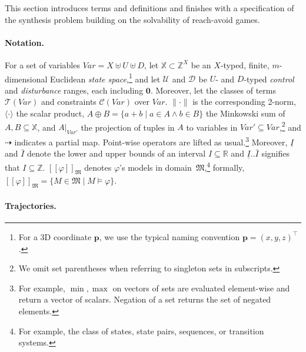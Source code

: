 \documentclass{article}
\newcommand\mkYcAoM[1][]{\mathcal{D}_{#1}}
\newcommand\mpBykPY[1][]{\mathcal{U}_{#1}}
\newcommand\mfBPXHb[1]{#1^\intercal}
\def\norm#1{\lVert#1\rVert}
\newcommand\mGctqYz[1][X]{\mathcal{C}(#1)}
\newcommand\mRxFzBg[1][X]{\mathcal{T}(#1)}
\newcommand\mcrHMQW[1]{[\![#1]\!]}
\renewcommand\vec[1]{\mathbf{#1}}
\begin{document}
{This section introduces terms and definitions and finishes with a
specification of the synthesis problem building on the solvability of
reach-avoid games.

\paragraph{Notation.} 

For a set of variables
$\mathit{Var}=X\uplus U\uplus D$,
let ${\mathbb{X}}\subset\ensuremath{\mathbb{Z}}^{X}$ be an $X$-typed,
finite,
$m$-dimensional Euclidean \emph{state space},\footnote{For a 3D
  coordinate $\vec p$, we use the typical naming convention
  $\vec p=\mfBPXHb{(x,y,z)}$.}  and let $\mpBykPY$ and $\mkYcAoM$
be $U$- and $D$-typed \emph{control} and
\emph{disturbance} ranges, each including $\vec 0$.
Moreover, let 
the classes of terms $\mRxFzBg[\mathit{Var}]$ 
and constraints
$\mGctqYz[\mathit{Var}]$ over $\mathit{Var}$.
$\norm\cdot$ is the corresponding 2-norm, $\langle\cdot\rangle$ the
scalar product, 
$A\oplus B=\{a+b\mid a\in A\land b\in B\}$ the Minkowski sum of
$A,B\subseteq{\mathbb{X}}$, and $A|_{\mathit{Var}'}$ the projection of
tuples 
in $A$ to variables in $\mathit{Var}'\subseteq\mathit{Var}$,\footnote{We
  omit set parentheses when referring to singleton sets 
  in subscripts.}  and $\dashrightarrow$ indicates a partial map.
Point-wise operators 
are lifted as usual.\footnote{For example, $\min,\max$ on vectors of
  sets are evaluated element-wise and return a vector of scalars.
  Negation of a set returns the set of negated elements.}  Moreover,
$\underline I$ and $\bar I$ denote the lower and
upper bounds of an interval $I\subseteq\ensuremath{\mathbb{R}}$ and
$\underline I..\bar I$ signifies that
$I\subseteq\ensuremath{\mathbb{Z}}$.
$\mcrHMQW\varphi_{\mathfrak{M}}$ denotes $\varphi$'s models in
domain~${\mathfrak{M}}$,\footnote{For example, the
  class of states, state pairs, sequences, or transition systems.}
formally,
$\mcrHMQW\varphi_{\mathfrak{M}} = \{M\in{\mathfrak{M}}\mid M\models\varphi\}$.

\paragraph{Trajectories.} 
\label{l:3}

}
\end{document}
